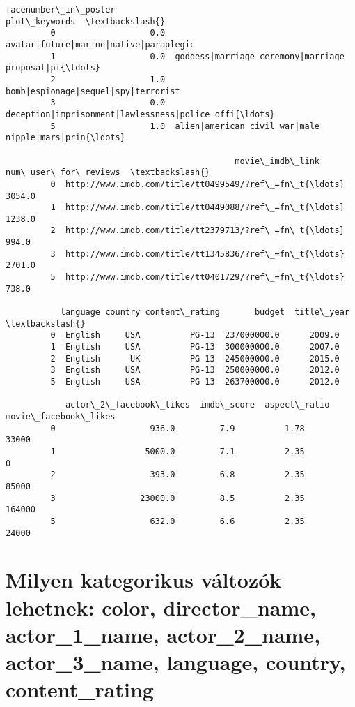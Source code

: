 \documentclass[11pt]{article}
\begin{document}
\begin{Verbatim}[commandchars=\\\{\}]
            facenumber\_in\_poster                                      plot\_keywords  \textbackslash{}
         0                   0.0             avatar|future|marine|native|paraplegic   
         1                   0.0  goddess|marriage ceremony|marriage proposal|pi{\ldots}   
         2                   1.0                bomb|espionage|sequel|spy|terrorist   
         3                   0.0  deception|imprisonment|lawlessness|police offi{\ldots}   
         5                   1.0  alien|american civil war|male nipple|mars|prin{\ldots}   
         
                                              movie\_imdb\_link  num\_user\_for\_reviews  \textbackslash{}
         0  http://www.imdb.com/title/tt0499549/?ref\_=fn\_t{\ldots}                3054.0   
         1  http://www.imdb.com/title/tt0449088/?ref\_=fn\_t{\ldots}                1238.0   
         2  http://www.imdb.com/title/tt2379713/?ref\_=fn\_t{\ldots}                 994.0   
         3  http://www.imdb.com/title/tt1345836/?ref\_=fn\_t{\ldots}                2701.0   
         5  http://www.imdb.com/title/tt0401729/?ref\_=fn\_t{\ldots}                 738.0   
         
           language country content\_rating       budget  title\_year  \textbackslash{}
         0  English     USA          PG-13  237000000.0      2009.0   
         1  English     USA          PG-13  300000000.0      2007.0   
         2  English      UK          PG-13  245000000.0      2015.0   
         3  English     USA          PG-13  250000000.0      2012.0   
         5  English     USA          PG-13  263700000.0      2012.0   
         
            actor\_2\_facebook\_likes  imdb\_score  aspect\_ratio  movie\_facebook\_likes  
         0                   936.0         7.9          1.78                 33000  
         1                  5000.0         7.1          2.35                     0  
         2                   393.0         6.8          2.35                 85000  
         3                 23000.0         8.5          2.35                164000  
         5                   632.0         6.6          2.35                 24000  
\end{Verbatim}
            
    \section{Milyen kategorikus változók lehetnek: color, director\_name,
actor\_1\_name, actor\_2\_name, actor\_3\_name, language, country,
content\_rating}\label{milyen-kategorikus-vuxe1ltozuxf3k-lehetnek-color-director_name-actor_1_name-actor_2_name-actor_3_name-language-country-content_rating}
\end{document}

